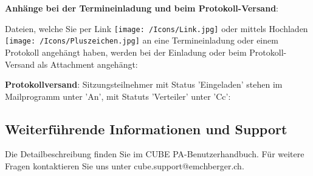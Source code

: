 \begin{figure}[H]
\end{figure}


\textbf{Anhänge bei der Termineinladung und beim Protokoll-Versand}:

Dateien, welche Sie per Link \texttt{[image: /Icons/Link.jpg]} oder mittels Hochladen \texttt{[image: /Icons/Pluszeichen.jpg]} an eine Termineinladung oder einem Protokoll angehängt haben, werden bei der Einladung oder beim Protokoll-Versand als Attachment angehängt:

\begin{figure}[H]
\end{figure}

\textbf{Protokollversand}: Sitzungsteilnehmer mit Status 'Eingeladen' stehen im Mailprogramm unter 'An', mit Statuts 'Verteiler' unter 'Cc':

\begin{figure}[H]
\end{figure}
		
\subsection{Weiterführende Informationen und Support} %

Die Detailbeschreibung finden Sie im CUBE PA-Benutzerhandbuch. Für weitere Fragen kontaktieren Sie uns unter {\color{red} cube.support@emchberger.ch}.
